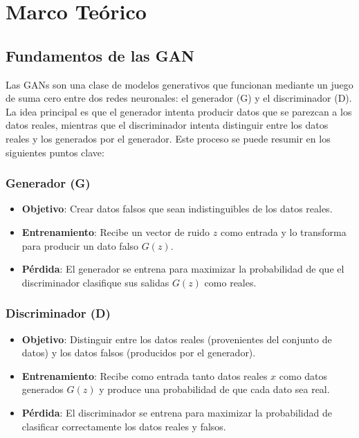 \section{Marco Teórico}\label{sec:marco teórico}

\subsection{Fundamentos de las GAN}
Las GANs son una clase de modelos generativos que funcionan mediante un juego de suma cero entre dos redes neuronales: el generador (G) y el discriminador (D). La idea principal es que el generador intenta producir datos que se parezcan a los datos reales, mientras que el discriminador intenta distinguir entre los datos reales y los generados por el generador. Este proceso se puede resumir en los siguientes puntos clave:

\subsubsection{Generador (G)}
\begin{itemize}
    \item \textbf{Objetivo}: Crear datos falsos que sean indistinguibles de los datos reales.
    \item \textbf{Entrenamiento}: Recibe un vector de ruido \( z \) como entrada y lo transforma para producir un dato falso \( G(z) \).
    \item \textbf{Pérdida}: El generador se entrena para maximizar la probabilidad de que el discriminador clasifique sus salidas \( G(z) \) como reales.
\end{itemize}

\subsubsection{Discriminador (D)}
\begin{itemize}
    \item \textbf{Objetivo}: Distinguir entre los datos reales (provenientes del conjunto de datos) y los datos falsos (producidos por el generador).
    \item \textbf{Entrenamiento}: Recibe como entrada tanto datos reales \( x \) como datos generados \( G(z) \) y produce una probabilidad de que cada dato sea real.
    \item \textbf{Pérdida}: El discriminador se entrena para maximizar la probabilidad de clasificar correctamente los datos reales y falsos.
\end{itemize}

